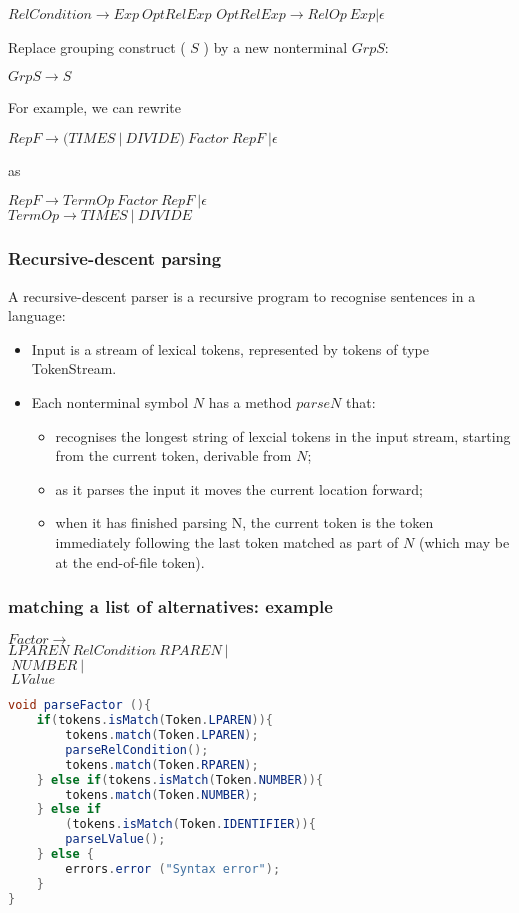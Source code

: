 $RelCondition \rightarrow Exp \ OptRelExp$
$OptRelExp \rightarrow RelOp \ Exp | \epsilon$

Replace grouping construct ( $S$ ) by a new nonterminal $GrpS$:

$GrpS \rightarrow S$

For example, we can rewrite

$RepF \rightarrow (TIMES \ | \ DIVIDE) \ Factor \ RepF \ | \epsilon$

as 

$RepF \rightarrow TermOp \ Factor \ RepF \ | \epsilon$ \\
$TermOp \rightarrow TIMES \ | \ DIVIDE$

\subsubsection{Recursive-descent parsing}
A recursive-descent parser is a recursive program to recognise sentences in a language:
\begin{itemize}
    \item Input is a stream of lexical tokens, represented by tokens of type TokenStream. 
    \item Each nonterminal symbol $N$ has a method $parseN$ that:
    \begin{itemize}
        \item recognises the longest string of lexcial tokens in the input stream, starting from the current token, derivable from $N$;
        \item as it parses the input it moves the current location forward;
        \item when it has finished parsing N, the current token is the token immediately following the last token matched as part of $N$ (which may be at the end-of-file token).
    \end{itemize}
\end{itemize}

\subsubsection{matching a list of alternatives: example}
\begin{scriptsize}
$Factor \rightarrow \ $ \\ 
$LPAREN \ RelCondition \ RPAREN \ |$ \\
$\ NUMBER \ |$ \\
$\ LValue $
\begin{lstlisting}[language=Java]
void parseFactor (){
    if(tokens.isMatch(Token.LPAREN)){
        tokens.match(Token.LPAREN);
        parseRelCondition();
        tokens.match(Token.RPAREN);
    } else if(tokens.isMatch(Token.NUMBER)){
        tokens.match(Token.NUMBER);
    } else if
        (tokens.isMatch(Token.IDENTIFIER)){
        parseLValue();
    } else {
        errors.error ("Syntax error");
    }
}
\end{lstlisting}
\end{scriptsize}

